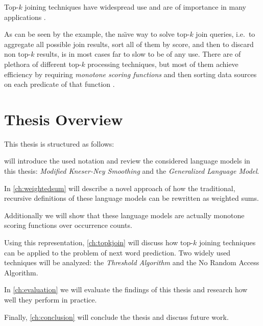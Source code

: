 \begin{draft}
Top-$k$ joining techniques have widespread use and are of importance in
many applications \noref.
\end{draft}

As can be seen by the example, the na\"{\i}ve way to solve top-$k$ join
queries, i.e.\ to aggregate all possible join results, sort all of them by
score, and then to discard non top-$k$ results, is in most cases far to
slow to be of any use.
There are of plethora of different top-$k$ processing techniques, but most
of them achieve efficiency by requiring \emph{monotone scoring functions} and
then sorting data sources on each predicate of that function
\parencite{Ilyas2008}.


\section{Thesis Overview}

This thesis is structured as follows:

 will introduce the used notation and review the considered
language models in this thesis: \emph{Modified Kneser-Ney Smoothing} and the
\emph{Generalized Language Model}.

In \cref{ch:weightedsum} will describe a novel approach of how the traditional,
recursive definitions of these language models can be rewritten as weighted
sums. \begin{draft}Additionally we will show that these language models are actually
monotone scoring functions over occurrence counts.\end{draft}

Using this representation, \cref{ch:topkjoin} will discuss how top-$k$ joining
techniques can be applied to the problem of next word prediction.
Two widely used techniques will be analyzed: the \emph{Threshold Algorithm} and
the {No Random Access Algorithm}.

In \cref{ch:evaluation} we will evaluate the findings of this thesis and
research how well they perform in practice.

Finally, \cref{ch:conclusion} will conclude the thesis and discuss future work.
